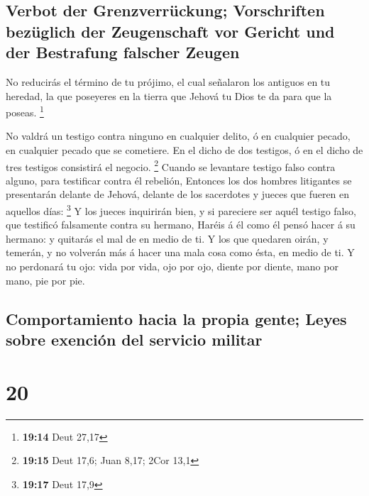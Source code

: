 \hypertarget{verbot-der-grenzverruxfcckung-vorschriften-bezuxfcglich-der-zeugenschaft-vor-gericht-und-der-bestrafung-falscher-zeugen}{%
\subsection{Verbot der Grenzverrückung; Vorschriften bezüglich der
Zeugenschaft vor Gericht und der Bestrafung falscher
Zeugen}\label{verbot-der-grenzverruxfcckung-vorschriften-bezuxfcglich-der-zeugenschaft-vor-gericht-und-der-bestrafung-falscher-zeugen}}

 No reducirás el término de tu prójimo, el cual señalaron
los antiguos en tu heredad, la que poseyeres en la tierra que Jehová tu
Dios te da para que la poseas. \footnote{\textbf{19:14} Deut 27,17}

 No valdrá un testigo contra ninguno en cualquier delito, ó
en cualquier pecado, en cualquier pecado que se cometiere. En el dicho
de dos testigos, ó en el dicho de tres testigos consistirá el negocio.
\footnote{\textbf{19:15} Deut 17,6; Juan 8,17; 2Cor 13,1} 
Cuando se levantare testigo falso contra alguno, para testificar contra
él rebelión,  Entonces los dos hombres litigantes se
presentarán delante de Jehová, delante de los sacerdotes y jueces que
fueren en aquellos días: \footnote{\textbf{19:17} Deut 17,9}
 Y los jueces inquirirán bien, y si pareciere ser aquél
testigo falso, que testificó falsamente contra su hermano, 
Haréis á él como él pensó hacer á su hermano: y quitarás el mal de en
medio de ti.  Y los que quedaren oirán, y temerán, y no
volverán más á hacer una mala cosa como ésta, en medio de ti.
 Y no perdonará tu ojo: vida por vida, ojo por ojo, diente
por diente, mano por mano, pie por pie.

\hypertarget{comportamiento-hacia-la-propia-gente-leyes-sobre-exenciuxf3n-del-servicio-militar}{%
\subsection{Comportamiento hacia la propia gente; Leyes sobre exención
del servicio
militar}\label{comportamiento-hacia-la-propia-gente-leyes-sobre-exenciuxf3n-del-servicio-militar}}

\hypertarget{section-19}{%
\section{20}\label{section-19}}

